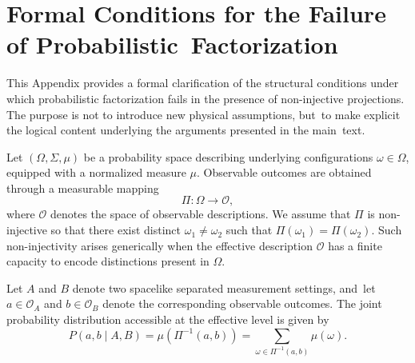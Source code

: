 \documentclass[quantumrep,article,accept,pdftex,oneauthor]{Definitions/mdpi}
\theoremstyle{remark}
\begin{document}




\appendixstart
\appendix


\section[\appendixname~\thesection]{Formal Conditions for the Failure of Probabilistic~Factorization}
  \label{app:factorization}

  This Appendix provides a formal clarification of the structural conditions under
  which probabilistic factorization fails in the presence of non-injective projections.
  The purpose is not to introduce new physical assumptions, but~to make explicit the
  logical content underlying the arguments presented in the main~text.

  Let $(\Omega,\Sigma,\mu)$ be a probability space describing underlying configurations
  $\omega \in \Omega$, equipped with a normalized measure $\mu$.
  Observable outcomes are obtained through a measurable mapping
  \begin{equation}
    \Pi : \Omega \rightarrow \mathcal{O},
  \end{equation}
  where $\mathcal{O}$ denotes the space of observable descriptions.
  We assume that $\Pi$ is non-injective so that there exist distinct
  $\omega_1 \neq \omega_2$ such that $\Pi(\omega_1)=\Pi(\omega_2)$.
  Such non-injectivity arises generically when the effective description $\mathcal{O}$
  has a finite capacity to encode distinctions present in $\Omega$.

  Let $A$ and $B$ denote two spacelike separated measurement settings, and~let
  $a \in \mathcal{O}_A$ and $b \in \mathcal{O}_B$ denote the corresponding observable
  outcomes.
  The joint probability distribution accessible at the effective level is given by
\begin{equation}
    P(a,b \mid A,B)
    =
    \mu\!\left(\Pi^{-1}(a,b)\right)
    =
    \sum_{\omega \in \Pi^{-1}(a,b)} \mu(\omega).
  \end{equation}
\end{document}
